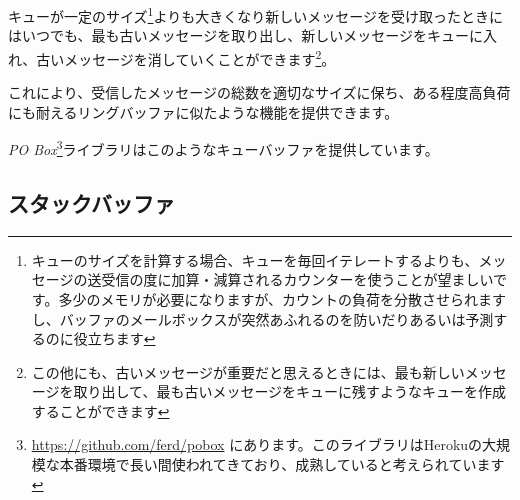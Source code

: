 キューが一定のサイズ\footnote{キューのサイズを計算する場合、キューを毎回イテレートするよりも、メッセージの送受信の度に加算・減算されるカウンターを使うことが望ましいです。多少のメモリが必要になりますが、カウントの負荷を分散させられますし、バッファのメールボックスが突然あふれるのを防いだりあるいは予測するのに役立ちます}よりも大きくなり新しいメッセージを受け取ったときにはいつでも、最も古いメッセージを取り出し、新しいメッセージをキューに入れ、古いメッセージを消していくことができます\footnote{この他にも、古いメッセージが重要だと思えるときには、最も新しいメッセージを取り出して、最も古いメッセージをキューに残すようなキューを作成することができます}。

これにより、受信したメッセージの総数を適切なサイズに保ち、ある程度高負荷にも耐えるリングバッファに似たような機能を提供できます。

\emph{PO Box}\footnote{\href{https://github.com/ferd/pobox}{https://github.com/ferd/pobox} にあります。このライブラリはHerokuの大規模な本番環境で長い間使われてきており、成熟していると考えられています}ライブラリはこのようなキューバッファを提供しています。


\subsection{スタックバッファ}

